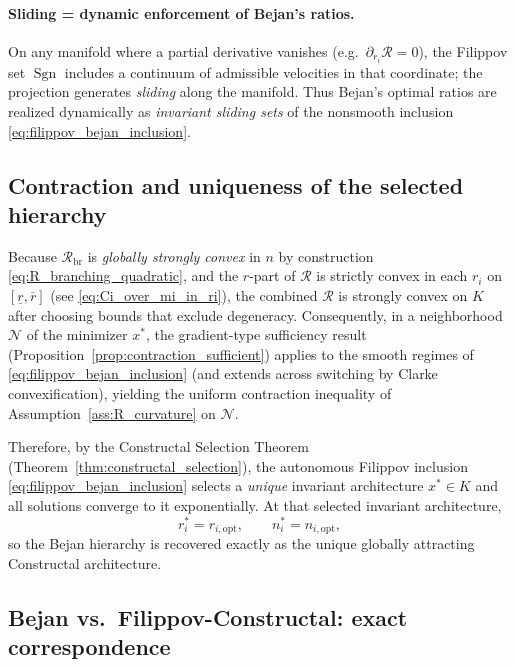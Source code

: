 \documentclass[12pt]{article}
\theoremstyle{plain}
\theoremstyle{definition}
\theoremstyle{remark}
\newcommand{\opt}{\mathrm{opt}}
\begin{document}
\paragraph{Sliding = dynamic enforcement of Bejan’s ratios.}
On any manifold where a partial derivative vanishes (e.g.\ $\partial_{r_i}\mathcal R=0$),
the Filippov set $\operatorname{Sgn}$ includes a continuum of admissible velocities
in that coordinate; the projection generates \emph{sliding} along the manifold.
Thus Bejan’s optimal ratios are realized dynamically as \emph{invariant sliding sets}
of the nonsmooth inclusion \eqref{eq:filippov_bejan_inclusion}.

\subsection{Contraction and uniqueness of the selected hierarchy}
\label{subsec:bejan_contraction}

Because $\mathcal R_{\mathrm{br}}$ is \emph{globally strongly convex} in $n$
by construction \eqref{eq:R_branching_quadratic}, and the $r$-part of
$\mathcal R$ is strictly convex in each $r_i$ on $[\underline r,\overline r]$
(see \eqref{eq:Ci_over_mi_in_ri}), the combined $\mathcal R$ is strongly convex
on $K$ after choosing bounds that exclude degeneracy.
Consequently, in a neighborhood $\mathcal N$ of the minimizer $x^\ast$,
the gradient-type sufficiency result
(Proposition~\ref{prop:contraction_sufficient}) applies to the smooth regimes
of \eqref{eq:filippov_bejan_inclusion} (and extends across switching by Clarke
convexification), yielding the uniform contraction inequality of
Assumption~\ref{ass:R_curvature} on $\mathcal N$.

Therefore, by the Constructal Selection Theorem
(Theorem~\ref{thm:constructal_selection}),
the autonomous Filippov inclusion \eqref{eq:filippov_bejan_inclusion}
selects a \emph{unique} invariant architecture $x^\ast\in K$ and all solutions
converge to it exponentially.
At that selected invariant architecture,
\[
r_i^\ast=r_{i,\opt},
\qquad
n_i^\ast=n_{i,\opt},
\]
so the Bejan hierarchy is recovered exactly as the unique globally attracting
Constructal architecture.

\subsection{Bejan vs.\ Filippov-Constructal: exact correspondence}
\label{subsec:bejan_vs_filippov_table}
\end{document}
